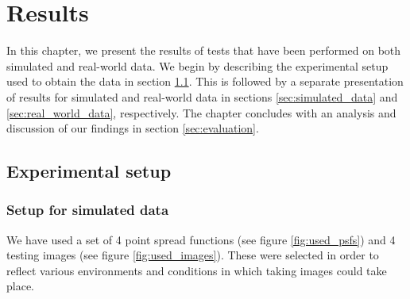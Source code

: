 \documentclass[12pt,notitlepage]{report}
\begin{document}
\chapter{Results}
\label{chap:results}

In this chapter, we present the results of tests that have been performed on both simulated and real-world data. We begin by describing the experimental setup used to obtain the data in section \ref{sec:experimental_setup}. This is followed by a separate presentation of results for simulated and real-world data in sections \ref{sec:simulated_data} and \ref{sec:real_world_data}, respectively. The chapter concludes with an analysis and discussion of our findings in section \ref{sec:evaluation}.

\clearpage

\section{Experimental setup}
\label{sec:experimental_setup}

\subsection{Setup for simulated data}
\label{sec:setup_for_simulated_data}

We have used a set of 4 point spread functions (see figure \ref{fig:used_psfs}) and 4 testing images (see figure \ref{fig:used_images}). These were selected in order to reflect various environments and conditions in which taking images could take place. 
\end{document}
